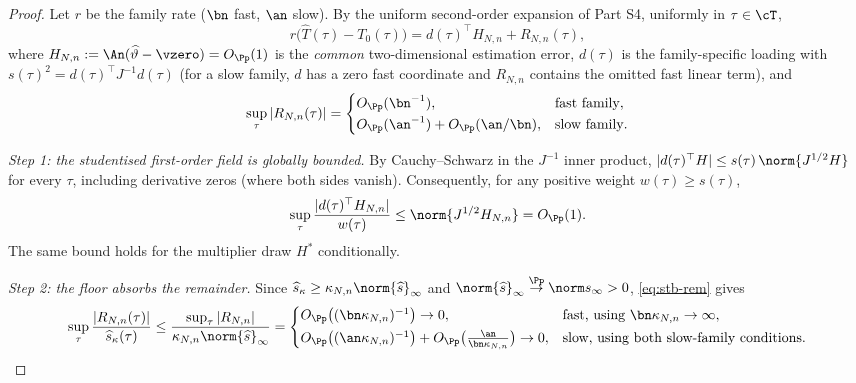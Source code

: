 \closuredraft
\begin{proof}
Let $r$ be the family rate ($\bn$ fast, $\an$ slow). By the uniform
second-order expansion of Part S4, uniformly in $\tau\in\cT$,
\begin{equation}\label{eq:stb-exp}
 r\big(\widehat T(\tau)-T_0(\tau)\big)
 =d(\tau)^\top H_{N,n}
 +R_{N,n}(\tau),
\end{equation}
where $H_{N,n}:=\An(\widehat\vartheta-\vzero)=O_{\Pp}(1)$ is the
\emph{common} two-dimensional estimation error, $d(\tau)$ is the
family-specific loading with $s(\tau)^2=d(\tau)^\top J^{-1}d(\tau)$
(for a slow family, $d$ has a zero fast coordinate and
$R_{N,n}$ contains the omitted fast linear term), and
\begin{equation}\label{eq:stb-rem}
 \sup_\tau|R_{N,n}(\tau)|
 =\begin{cases}
 O_{\Pp}(\bn^{-1}), & \text{fast family},\\[1pt]
 O_{\Pp}(\an^{-1})+O_{\Pp}(\an/\bn), & \text{slow family}.
 \end{cases}
\end{equation}

\emph{Step 1: the studentised first-order field is globally bounded.}
By Cauchy--Schwarz in the $J^{-1}$ inner product,
$|d(\tau)^\top H|\le s(\tau)\,\norm{J^{1/2}H}$ for every $\tau$, including
derivative zeros (where both sides vanish). Consequently, for any positive
weight $w(\tau)\ge s(\tau)$,
\begin{equation}\label{eq:stb-cs}
 \sup_\tau\frac{|d(\tau)^\top H_{N,n}|}{w(\tau)}
 \le\norm{J^{1/2}H_{N,n}}=O_{\Pp}(1).
\end{equation}
The same bound holds for the multiplier draw $H^*$ conditionally.

\emph{Step 2: the floor absorbs the remainder.}
Since $\widehat s_\kappa\ge\kappa_{N,n}\norm{\widehat s}_\infty$ and
$\norm{\widehat s}_\infty\overset{\Pp}{\to}\norm s_\infty>0$,
\eqref{eq:stb-rem} gives
\[
 \sup_\tau\frac{|R_{N,n}(\tau)|}{\widehat s_\kappa(\tau)}
 \le\frac{\sup_\tau|R_{N,n}|}{\kappa_{N,n}\norm{\widehat s}_\infty}
 =\begin{cases}
 O_{\Pp}\big((\bn\kappa_{N,n})^{-1}\big)\to0,
 &\text{fast, using }\bn\kappa_{N,n}\to\infty,\\[2pt]
 O_{\Pp}\big((\an\kappa_{N,n})^{-1}\big)
 +O_{\Pp}\big(\tfrac{\an}{\bn\kappa_{N,n}}\big)\to0,
 &\text{slow, using both slow-family conditions}.
 \end{cases}
\]


\end{proof}
